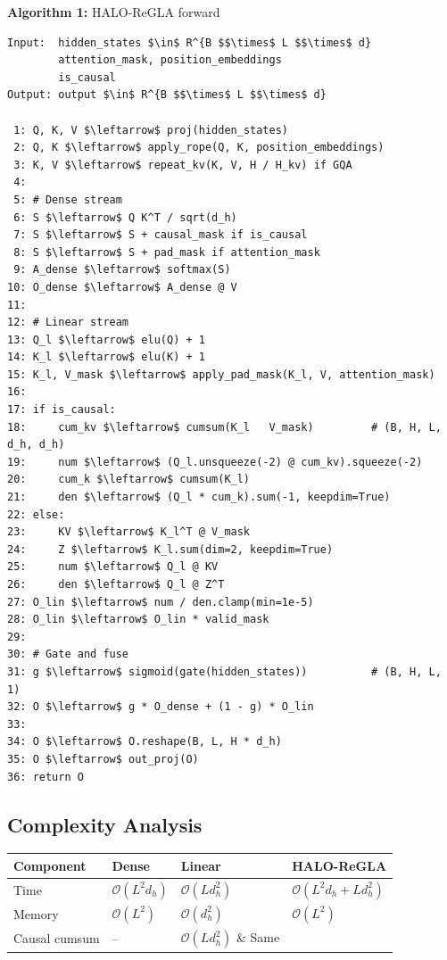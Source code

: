\textbf{Algorithm 1:} HALO-ReGLA forward
\begin{lstlisting}
Input:  hidden_states $\in$ R^{B $$\times$ L $$\times$ d}
        attention_mask, position_embeddings
        is_causal
Output: output $\in$ R^{B $$\times$ L $$\times$ d}

 1: Q, K, V $\leftarrow$ proj(hidden_states)
 2: Q, K $\leftarrow$ apply_rope(Q, K, position_embeddings)
 3: K, V $\leftarrow$ repeat_kv(K, V, H / H_kv) if GQA
 4:
 5: # Dense stream
 6: S $\leftarrow$ Q K^T / sqrt(d_h)
 7: S $\leftarrow$ S + causal_mask if is_causal
 8: S $\leftarrow$ S + pad_mask if attention_mask
 9: A_dense $\leftarrow$ softmax(S)
10: O_dense $\leftarrow$ A_dense @ V
11:
12: # Linear stream
13: Q_l $\leftarrow$ elu(Q) + 1
14: K_l $\leftarrow$ elu(K) + 1
15: K_l, V_mask $\leftarrow$ apply_pad_mask(K_l, V, attention_mask)
16:
17: if is_causal:
18:     cum_kv $\leftarrow$ cumsum(K_l   V_mask)         # (B, H, L, d_h, d_h)
19:     num $\leftarrow$ (Q_l.unsqueeze(-2) @ cum_kv).squeeze(-2)
20:     cum_k $\leftarrow$ cumsum(K_l)
21:     den $\leftarrow$ (Q_l * cum_k).sum(-1, keepdim=True)
22: else:
23:     KV $\leftarrow$ K_l^T @ V_mask
24:     Z $\leftarrow$ K_l.sum(dim=2, keepdim=True)
25:     num $\leftarrow$ Q_l @ KV
26:     den $\leftarrow$ Q_l @ Z^T
27: O_lin $\leftarrow$ num / den.clamp(min=1e-5)
28: O_lin $\leftarrow$ O_lin * valid_mask
29:
30: # Gate and fuse
31: g $\leftarrow$ sigmoid(gate(hidden_states))          # (B, H, L, 1)
32: O $\leftarrow$ g * O_dense + (1 - g) * O_lin
33:
34: O $\leftarrow$ O.reshape(B, L, H * d_h)
35: O $\leftarrow$ out_proj(O)
36: return O
\end{lstlisting}

\subsection{Complexity Analysis}

\begin{table}[H]
\centering
\small
\begin{tabular}{llll}
\toprule
\textbf{Component} & \textbf{Dense} & \textbf{Linear} & \textbf{HALO-ReGLA} \\
\midrule
Time & $\mathcal{O}(L^2 d_h)$ & $\mathcal{O}(L d_h^2)$ & $\mathcal{O}(L^2 d_h + L d_h^2)$ \\
Memory & $\mathcal{O}(L^2)$ & $\mathcal{O}(d_h^2)$ & $\mathcal{O}(L^2)$ \\
Causal cumsum & -- & $\mathcal{O}(L d_h^2)$ \& Same \\
\bottomrule
\end{tabular}
\end{table}

